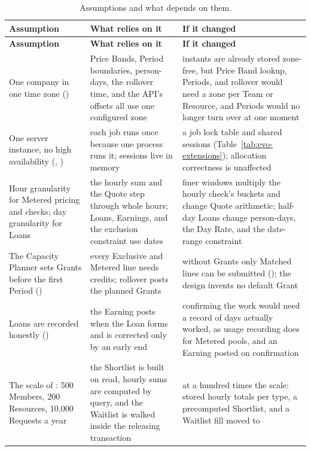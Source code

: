 {\footnotesize\setlength{\tabcolsep}{4pt}\renewcommand{\arraystretch}{1.08}
\begin{longtable}{@{}L{0.22\textwidth}L{0.37\textwidth}L{\tabcolsep\relax}@{}}
\caption{Assumptions and what depends on them.}\label{tab:evo-assumptions}\\
\toprule
\textbf{Assumption} & \textbf{What relies on it} & \textbf{If it changed} \\
\midrule
\endfirsthead
\toprule
\textbf{Assumption} & \textbf{What relies on it} & \textbf{If it changed} \\
\midrule
\endhead
\bottomrule
\endlastfoot
One company in one time zone () & Price Bands, Period boundaries, person-days, the rollover time, and the API's offsets all use one configured zone & instants are already stored zone-free, but Price Band lookup, Periods, and rollover would need a zone per Team or Resource, and Periods would no longer turn over at one moment \\
One server instance, no high availability (, ) & each job runs once because one process runs it; sessions live in memory & a job lock table and shared sessions (Table~\ref{tab:evo-extensions}); allocation correctness is unaffected \\
Hour granularity for Metered pricing and checks; day granularity for Loans & the hourly sum and the Quote step through whole hours; Loans, Earnings, and the  exclusion constraint use dates & finer windows multiply the hourly check's buckets and change Quote arithmetic; half-day Loans change person-days, the Day Rate, and the date-range constraint \\
The Capacity Planner sets Grants before the first Period () & every Exclusive and Metered line needs credits; rollover posts the planned Grants & without Grants only Matched lines can be submitted (); the design invents no default Grant \\
Loans are recorded honestly () & the Earning posts when the Loan forms and is corrected only by an early end & confirming the work would need a record of days actually worked, as usage recording does for Metered pools, and an Earning posted on confirmation \\
The scale of : 500 Members, 200 Resources, 10,000 Requests a year & the Shortlist is built on read, hourly sums are computed by query, and the Waitlist is walked inside the releasing transaction & at a hundred times the scale: stored hourly totals per type, a precomputed Shortlist, and a Waitlist fill moved to  \\
\end{longtable}
}

